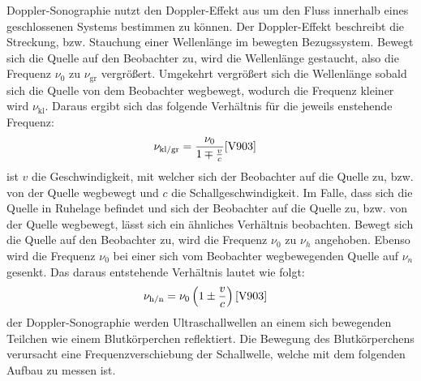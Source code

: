     \justifying Doppler-Sonographie nutzt den Doppler-Effekt aus um den Fluss innerhalb eines geschlossenen Systems bestimmen zu können. Der Doppler-Effekt 
    beschreibt die Streckung, bzw. Stauchung einer Wellenlänge im bewegten Bezugssystem. Bewegt sich die Quelle auf den Beobachter zu, wird die Wellenlänge gestaucht, also die
    Frequenz $\nu_0$ zu $\nu_{\text{gr}}$ vergrößert. Umgekehrt vergrößert sich die Wellenlänge sobald sich die Quelle von dem Beobachter wegbewegt, wodurch die Frequenz kleiner wird 
    $\nu_{\text{kl}}$. Daraus ergibt sich das folgende Verhältnis für die jeweils enstehende Frequenz: 
    \begin{align}
        \nu_{\text{kl/gr}} &= \frac{\nu_0}{1\mp \frac{v}{c}} \label{eq:1} \text{\cite{V903}}
    \end{align}
    \justifying ist $v$ die Geschwindigkeit, mit welcher sich der Beobachter auf die Quelle zu, bzw. von der Quelle wegbewegt und $c$ die Schallgeschwindigkeit.
    Im Falle, dass sich die Quelle in Ruhelage befindet und sich der Beobachter auf die Quelle zu, bzw. von der Quelle wegbewegt, lässt sich ein ähnliches 
    Verhältnis beobachten. Bewegt sich die Quelle auf den Beobachter zu, wird die Frequenz $\nu_0$ zu $\nu_h$ angehoben. Ebenso wird die Frequenz $\nu_0$ bei einer sich vom Beobachter 
    wegbewegenden Quelle auf $\nu_n$ gesenkt. Das daraus entstehende Verhältnis lautet wie folgt: 
    \begin{align}
        \nu_{\text{h/n}} &= \nu_0 \left( 1\pm \frac{v}{c} \right) \label{eq:2} \text{\cite{V903}}
    \end{align}
    \justifying der Doppler-Sonographie werden Ultraschallwellen an einem sich bewegenden Teilchen wie einem Blutkörperchen reflektiert. Die Bewegung des Blutkörperchens
    verursacht eine Frequenzverschiebung der Schallwelle, welche mit dem folgenden Aufbau zu messen ist.

